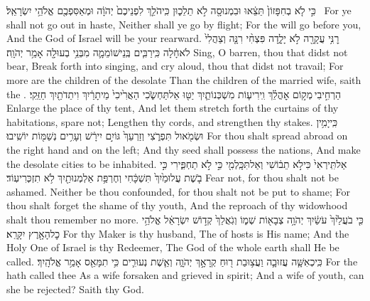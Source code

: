 {כִּ֣י לֹ֤א בְחִפָּזוֹן֙ תֵּצֵ֔אוּ וּבִמְנוּסָ֖ה לֹ֣א תֵלֵכ֑וּן כִּֽי\maqqaf הֹלֵ֤ךְ לִפְנֵיכֶם֙ יְהֹוָ֔ה וּמְאַסִּפְכֶ֖ם אֱלֹהֵ֥י יִשְׂרָאֵֽל׃ \setuma }
{For ye shall not go out in haste, Neither shall ye go by flight; For the \lord\space will go before you, And the God of Israel will be your rearward.}
\newperek
{}
\label{haft_49}
\setcounter{chap}{54}
\setcounter{verse}{1}
{רׇנִּ֥י עֲקָרָ֖ה לֹ֣א יָלָ֑דָה פִּצְחִ֨י רִנָּ֤ה וְצַהֲלִי֙ לֹא\maqqaf חָ֔לָה כִּֽי\maqqaf רַבִּ֧ים בְּֽנֵי\maqqaf שׁוֹמֵמָ֛ה מִבְּנֵ֥י בְעוּלָ֖ה אָמַ֥ר יְהֹוָֽה׃}
{Sing, O barren, thou that didst not bear, Break forth into singing, and cry aloud, thou that didst not travail; For more are the children of the desolate Than the children of the married wife, saith the \lord.}
{הַרְחִ֣יבִי \legarmeh  מְק֣וֹם אׇהֳלֵ֗ךְ וִֽירִיע֧וֹת מִשְׁכְּנוֹתַ֛יִךְ יַטּ֖וּ אַל\maqqaf תַּחְשֹׂ֑כִי הַאֲרִ֙יכִי֙ מֵיתָרַ֔יִךְ וִיתֵדֹתַ֖יִךְ חַזֵּֽקִי׃}
{Enlarge the place of thy tent, And let them stretch forth the curtains of thy habitations, spare not; Lengthen thy cords, and strengthen thy stakes.}
{כִּֽי\maqqaf יָמִ֥ין וּשְׂמֹ֖אול תִּפְרֹ֑צִי וְזַרְעֵךְ֙ גּוֹיִ֣ם יִירָ֔שׁ וְעָרִ֥ים נְשַׁמּ֖וֹת יוֹשִֽׁיבוּ׃}
{For thou shalt spread abroad on the right hand and on the left; And thy seed shall possess the nations, And make the desolate cities to be inhabited.}
{אַל\maqqaf תִּֽירְאִי֙ כִּי\maqqaf לֹ֣א תֵב֔וֹשִׁי וְאַל\maqqaf תִּכָּֽלְמִ֖י כִּ֣י לֹ֣א תַחְפִּ֑ירִי כִּ֣י בֹ֤שֶׁת עֲלוּמַ֙יִךְ֙ תִּשְׁכָּ֔חִי וְחֶרְפַּ֥ת אַלְמְנוּתַ֖יִךְ לֹ֥א תִזְכְּרִי\maqqaf עֽוֹד׃}
{Fear not, for thou shalt not be ashamed. Neither be thou confounded, for thou shalt not be put to shame; For thou shalt forget the shame of thy youth, And the reproach of thy widowhood shalt thou remember no more.}
{כִּ֤י בֹעֲלַ֙יִךְ֙ עֹשַׂ֔יִךְ יְהֹוָ֥ה צְבָא֖וֹת שְׁמ֑וֹ וְגֹֽאֲלֵךְ֙ קְד֣וֹשׁ יִשְׂרָאֵ֔ל אֱלֹהֵ֥י כׇל\maqqaf הָאָ֖רֶץ יִקָּרֵֽא׃}
{For thy Maker is thy husband, The \lord\space of hosts is His name; And the Holy One of Israel is thy Redeemer, The God of the whole earth shall He be called.}
{כִּֽי\maqqaf כְאִשָּׁ֧ה עֲזוּבָ֛ה וַעֲצ֥וּבַת ר֖וּחַ קְרָאָ֣ךְ יְהֹוָ֑ה וְאֵ֧שֶׁת נְעוּרִ֛ים כִּ֥י תִמָּאֵ֖ס אָמַ֥ר אֱלֹהָֽיִךְ׃}
{For the \lord\space hath called thee As a wife forsaken and grieved in spirit; And a wife of youth, can she be rejected? Saith thy God.}
